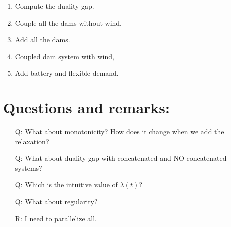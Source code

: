 \documentclass[12pt]{article}
\theoremstyle{definition}
\theoremstyle{remark}
\begin{document}
\begin{enumerate}
\item Compute the duality gap.

\item Couple all the dams without wind.

\item Add all the dams.

\item Coupled dam system with wind,

\item Add battery and flexible demand.

\end{enumerate}

\section{Questions and remarks:}

\begin{enumerate}
\item[Q:] What about monotonicity? How does it change when we add the relaxation?

\item[Q:] What about duality gap with concatenated and NO concatenated systems?

\item[Q:] Which is the intuitive value of $\lambda(t)$?

\item[Q:] What about regularity?

\item[R:] I need to parallelize all.
\end{enumerate}
\end{document}
